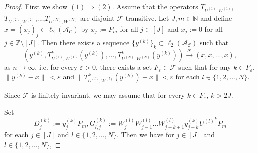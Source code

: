 \documentclass{article}
\begin{document}
\begin{proof}
	First we show $(1)\Rightarrow(2)$. Assume that the operators $T_{U^{(1)},W^{(1)}}$, $T_{U^{(2)},W^{(2)}}$,...,$T_{U^{(N)},W^{(N)}}$ are disjoint $\mathcal{F}$-transitive.
	Let $J,m\in\mathbb{N}$ and define $x=(x_{j})_{j}\in \ell_{2}{(\mathcal{A_{C}})}$ by $x_{j}:=P_{m}$ for all $j\in[J]$ and $x_{j}:=0$ for all $j\in \mathbb{Z}\setminus[J]$.
	Then there exists a sequence $\{y^{(k)}\}_{k}\subset \ell_{2}(\mathcal{A_{C}})$ such that
	\[(y^{(k)}, T^{k}_{U^{(1)},W^{(1)}}(y^{(k)}), ..., T^{k}_{U^{(N)},W^{(N)}}(y^{(k)}))\stackrel{\mathcal F}{\longrightarrow}(x,x, ..., x),\]
	as $n\rightarrow\infty$, i.e. for every $\varepsilon>0$, there exists a set $F_{\varepsilon}\in\mathcal{F}$ such that for any $k\in F_{\varepsilon}$, $\|y^{(k)}-x\|\ <\varepsilon$ and $\|T^{k}_{U^{(l)},W^{(l)}}(y^{(k)})-x\|<\varepsilon$ for each $l\in \{1,2,...,N\}$.
	
	Since $\mathcal{F}$ is finitely invariant, we may assume that for every $k\in F_{\varepsilon}$, $k>2J$.
	
	Set
	\[D^{(k)}_{j}:=y^{(k)}_{j}P_{m}, G^{(k)}_{l,j}:=W^{(l)}_{j}W^{(l)}_{j-1}...W^{(l)}_{j-k+1}y^{(k)}_{j-k}{U^{(l)}}^{k}P_{m}\]
	for each $j\in[J]$ and $l\in \{1,2,...,N\}$. 
	Then we have for $j\in[J]$ and $l\in\{1,2,...,N\}$,
	

\end{proof}
\end{document}
